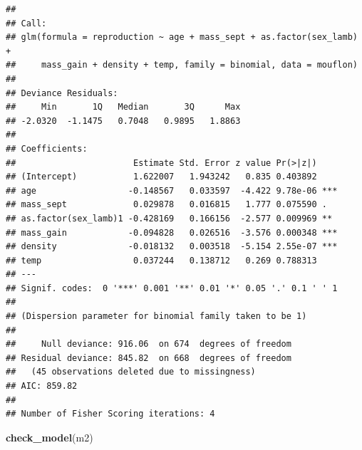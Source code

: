 \documentclass[
  12pt,
]{book}
\newenvironment{Shaded}{\begin{snugshade}}{\end{snugshade}}
\newcommand{\KeywordTok}[1]{\textcolor[rgb]{0.13,0.29,0.53}{\textbf{#1}}}
\newcommand{\NormalTok}[1]{#1}
\begin{document}
\begin{verbatim}
## 
## Call:
## glm(formula = reproduction ~ age + mass_sept + as.factor(sex_lamb) + 
##     mass_gain + density + temp, family = binomial, data = mouflon)
## 
## Deviance Residuals: 
##     Min       1Q   Median       3Q      Max  
## -2.0320  -1.1475   0.7048   0.9895   1.8863  
## 
## Coefficients:
##                       Estimate Std. Error z value Pr(>|z|)    
## (Intercept)           1.622007   1.943242   0.835 0.403892    
## age                  -0.148567   0.033597  -4.422 9.78e-06 ***
## mass_sept             0.029878   0.016815   1.777 0.075590 .  
## as.factor(sex_lamb)1 -0.428169   0.166156  -2.577 0.009969 ** 
## mass_gain            -0.094828   0.026516  -3.576 0.000348 ***
## density              -0.018132   0.003518  -5.154 2.55e-07 ***
## temp                  0.037244   0.138712   0.269 0.788313    
## ---
## Signif. codes:  0 '***' 0.001 '**' 0.01 '*' 0.05 '.' 0.1 ' ' 1
## 
## (Dispersion parameter for binomial family taken to be 1)
## 
##     Null deviance: 916.06  on 674  degrees of freedom
## Residual deviance: 845.82  on 668  degrees of freedom
##   (45 observations deleted due to missingness)
## AIC: 859.82
## 
## Number of Fisher Scoring iterations: 4
\end{verbatim}

\begin{Shaded}
\begin{Highlighting}[]
\KeywordTok{check\_model}\NormalTok{(m2)}
\end{Highlighting}
\end{Shaded}
\end{document}
